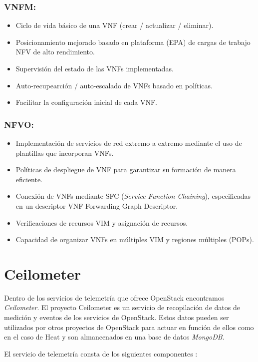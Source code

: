 \subsubsection{VNFM:} 
\begin{itemize}
\item Ciclo de vida básico de una VNF (crear / actualizar / eliminar).
\item Posicionamiento mejorado basado en plataforma (EPA) de cargas de trabajo NFV de alto rendimiento.
\item Supervisión del estado de las VNFs implementadas.
\item Auto-recupearción / auto-escalado  de VNFs basado en políticas.
\item Facilitar la configuración inicial de cada VNF.
\end{itemize}

\subsubsection{NFVO:} 
\begin{itemize}
\item Implementación de servicios de red  extremo a extremo mediante el uso de plantillas que incorporan VNFs.
\item Políticas de despliegue de VNF para garantizar su formación de manera eficiente.
\item Conexión de VNFs mediante SFC (\textit{Service Function Chaining}),  especificadas en un descriptor VNF Forwarding Graph Descriptor.
\item Verificaciones de recursos VIM y asignación de recursos.
\item Capacidad de organizar VNFs en múltiples VIM y regiones múltiples (POPs).
\end{itemize}

\section{Ceilometer}
Dentro de los servicios de telemetría que ofrece OpenStack encontramos \textit{Ceilometer}. El proyecto Ceilometer es un servicio de recopilación de datos de medición y eventos de los servicios de OpenStack. Estos datos pueden ser utilizados por otros proyectos de OpenStack para actuar en función de ellos como en el caso de Heat y son almancenados en una base de datos \textit{MongoDB}.

El servicio de telemetría consta de los siguientes componentes \cite{noauthor_celiometer_nodate}:

